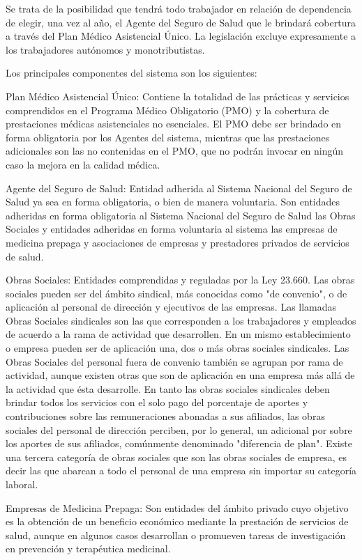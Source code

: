 Se trata de la posibilidad que tendrá todo trabajador en relación de dependencia de elegir, una vez al año, el Agente del Seguro de Salud que le brindará cobertura a través del Plan Médico Asistencial Único. La legislación excluye expresamente a los trabajadores autónomos y monotributistas.

Los principales componentes del sistema son los siguientes:

Plan Médico Asistencial Único: Contiene la totalidad de las prácticas y servicios comprendidos en el Programa Médico Obligatorio (PMO) y la cobertura de prestaciones médicas asistenciales no esenciales. El PMO debe ser brindado en forma obligatoria por los Agentes del sistema, mientras que las prestaciones adicionales son las no contenidas en el PMO, que no podrán invocar en ningún caso la mejora en la calidad médica.

Agente del Seguro de Salud: Entidad adherida al Sistema Nacional del Seguro de Salud ya sea en forma obligatoria, o bien de manera voluntaria. Son entidades adheridas en forma obligatoria al Sistema Nacional del Seguro de Salud las Obras Sociales y entidades adheridas en forma voluntaria al sistema las empresas de medicina prepaga y asociaciones de empresas y prestadores privados de servicios de salud.

Obras Sociales: Entidades comprendidas y reguladas por la Ley 23.660. Las obras sociales pueden ser del ámbito sindical, más conocidas como "de convenio", o de aplicación al personal de dirección y ejecutivos de las empresas. Las llamadas Obras Sociales sindicales son las que corresponden a los trabajadores y empleados de acuerdo a la rama de actividad que desarrollen. En un mismo establecimiento o empresa pueden ser de aplicación una, dos o más obras sociales sindicales. Las Obras Sociales del personal fuera de convenio también se agrupan por rama de actividad, aunque existen otras que son de aplicación en una empresa más allá de la actividad que ésta desarrolle. En tanto las obras sociales sindicales deben brindar todos los servicios con el solo pago del porcentaje de aportes y contribuciones sobre las remuneraciones abonadas a sus afiliados, las obras sociales del personal de dirección perciben, por lo general, un adicional por sobre los aportes de sus afiliados, comúnmente denominado "diferencia de plan". Existe una tercera categoría de obras sociales que son las obras sociales de empresa, es decir las que abarcan a todo el personal de una empresa sin importar su categoría laboral.

Empresas de Medicina Prepaga: Son entidades del ámbito privado cuyo objetivo es la obtención de un beneficio económico mediante la prestación de servicios de salud, aunque en algunos casos desarrollan o promueven tareas de investigación en prevención y terapéutica medicinal.


